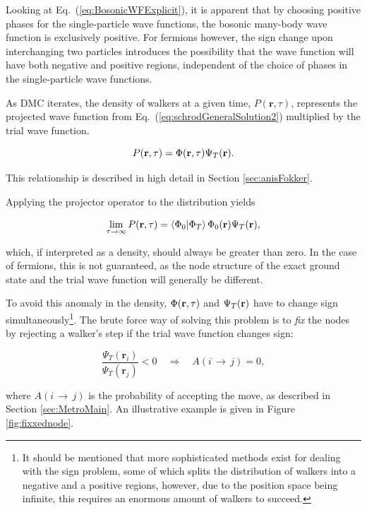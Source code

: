Looking at Eq.~(\ref{eq:BosonicWFExplicit}), it is apparent that by choosing positive phases for the single-particle wave functions, the bosonic many-body wave function is exclusively positive. For fermions however, the sign change upon interchanging two particles introduces the possibility that the wave function will have both negative and positive regions, independent of the choice of phases in the single-particle wave functions.

As DMC iterates, the density of walkers at a given time, $P(\mathbf{r}, \tau)$, represents the projected wave function from Eq.~(\ref{eq:schrodGeneralSolution2}) multiplied by the trial wave function. 

\begin{equation}
 P(\mathbf{r}, \tau) = \Phi(\mathbf{r}, \tau)\Psi_T(\mathbf{r}).
\end{equation}

This relationship is described in high detail in Section \ref{sec:anisFokker}.

Applying the projector operator to the distribution yields

\begin{equation}
  \lim_{\tau\to\infty} P(\mathbf{r}, \tau) = \left\langle \Phi_0 | \Phi_T\right\rangle\Phi_0(\mathbf{r})\Psi_T(\mathbf{r}),
\end{equation}

which, if interpreted as a density, should always be greater than zero. In the case of fermions, this is not guaranteed, as
the node structure of the exact ground state and the trial wave function will generally be different.  

To avoid this anomaly in the density, $\Phi(\mathbf{r}, \tau)$ and $\Psi_T(\mathbf{r})$ have to change sign simultaneously\footnote{It should be mentioned that more sophisticated methods exist for dealing with the sign problem, some of which splits the distribution of walkers into a negative and a positive regions, however, due to the position space being infinite, this requires an enormous amount of walkers to succeed.}. The brute force way of solving this problem is to \textit{fix} the nodes by rejecting a walker's step if the trial wave function changes sign:

\begin{equation}
\frac{\Psi_T(\mathbf{r}_i)}{\Psi_T(\mathbf{r}_j)} < 0 \quad\Longrightarrow\quad A(i\,\rightarrow\,j) = 0,
\end{equation}

where $A(i\,\rightarrow\,j)$ is the probability of accepting the move, as described in Section \ref{sec:MetroMain}. An illustrative example is given in Figure \ref{fig:fixxednode}.

